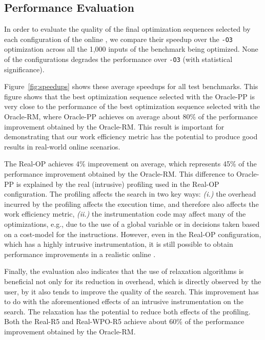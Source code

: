 

\subsection{Performance Evaluation}

In order to evaluate the quality of the final optimization sequences selected by
each configuration of the online {\itercomp}, we compare their speedup over the
\texttt{-O3} optimization across all the 1,000 inputs of the benchmark being
optimized.
None of the configurations degrades the performance over \texttt{-O3} (with
statistical significance).

Figure~\ref{fig:speedups} shows these average speedups for all test benchmarks.
This figure shows that the best optimization sequence selected with the Oracle-PP
is very close to the performance of the best optimization sequence selected with
the Oracle-RM, where Oracle-PP achieves on average about 80\% of the performance
improvement obtained by the Oracle-RM.
This result is important for demonstrating that our work efficiency metric has
the potential to produce good results in real-world online scenarios.

The Real-OP achieves 4\% improvement on average, which represents 45\% of the
performance improvement obtained by the Oracle-RM.
This difference to Oracle-PP is explained by the real (intrusive) profiling used
in the Real-OP configuration.
The profiling affects the search in two key ways:
\textit{(i.)} the overhead incurred by the profiling affects the execution time,
and therefore also affects the work efficiency metric,
\textit{(ii.)} the instrumentation code may affect many of the optimizations, e.g.,
due to the use of a global variable or in decisions taken based on a cost-model
for the instructions.
However, even in the Real-OP configuration, which has a highly intrusive instrumentation,
it is still possible to obtain performance improvements in a realistic online
{\itercomp}.

Finally, the evaluation also indicates that the use of relaxation algorithms
is beneficial not only for its reduction in overhead, which is directly observed
by the user, by it also tends to improve the quality of the search.
This improvement has to do with the aforementioned effects of an intrusive
instrumentation on the search.
The relaxation has the potential to reduce both effects of the profiling.
Both the Real-R5 and Real-WPO-R5 achieve about 60\% of the
performance improvement obtained by the Oracle-RM.
